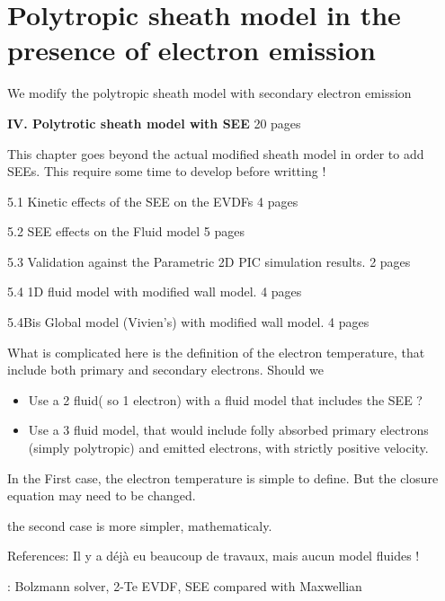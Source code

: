 



\chapter{Polytropic sheath model in the presence of electron emission}
\label{ch-4}

\begin{Chabstract}
  
We modify the polytropic sheath model with secondary electron emission
\end{Chabstract}

{\bf IV. Polytrotic sheath model with SEE} 20 pages
\begin{zzz}
  This chapter goes beyond the actual modified sheath model in order to add SEEs.
  This require some time to develop before writting !

  5.1 Kinetic effects of the SEE on the EVDFs  4 pages

  5.2 SEE effects on the Fluid model  5 pages

  5.3 Validation against the Parametric 2D PIC simulation results. 2 pages
  
  5.4 1D fluid model with modified wall model. 4 pages
  
  5.4Bis Global model (Vivien's) with modified wall model. 4 pages
\end{zzz}

\minitoc

What is complicated here is the definition of the electron temperature, that include both primary and secondary electrons.
Should we
\begin{itemize}
  \item Use a 2 fluid( so 1 electron) with a fluid model that includes the SEE ?
  \item Use a 3 fluid model, that would  include folly absorbed primary electrons (simply polytropic) and emitted electrons, with strictly positive velocity.
\end{itemize}

In the First case, the electron temperature is simple to define.
But the closure equation may need to be changed.

the second case is more simpler, mathematicaly.

References:
Il y a déjà eu beaucoup de travaux, mais aucun model fluides !

\citet{meezan2002} : Bolzmann solver, 2-Te EVDF, SEE compared with Maxwellian

